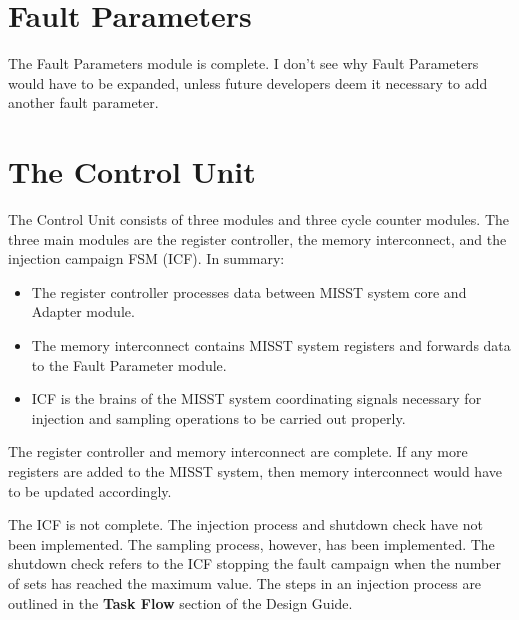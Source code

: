 \documentclass[]{report}
\begin{document}
\section{Fault Parameters}
The Fault Parameters module is complete. I don't see why Fault Parameters would have to be expanded, unless future developers deem it necessary to add another fault parameter.

\section{The Control Unit}
The Control Unit consists of three modules and three cycle counter modules. The three main modules are the register controller, the memory interconnect, and the injection campaign FSM (ICF). In summary:
\begin{itemize}
	\item The register controller processes data between MISST system core and Adapter module.
	\item The memory interconnect contains MISST system registers and forwards data to the Fault Parameter module.
	\item ICF is the brains of the MISST system coordinating signals necessary for injection and sampling operations to be carried out properly.
\end{itemize} 

The register controller and memory interconnect are complete. If any more registers are added to the MISST system, then memory interconnect would have to be updated accordingly.

The ICF is not complete. The injection process and shutdown check have not been implemented. The sampling process, however, has been implemented. The shutdown check refers to the ICF stopping the fault campaign when the number of sets has reached the maximum value. The steps in an injection process are outlined in the \textbf{Task Flow} section of the Design Guide.
\end{document}
